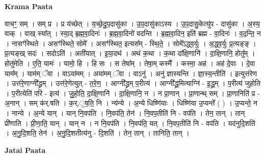 \documentclass[17pt]{extarticle}
\begin{document}
\textbf{Krama Paata} \newline

वाचꣳ॒॒ सम् । सम् प्र । प्र य॑च्छेत् । य॒च्छे॒दु॒प॒दासु॑का । उ॒प॒दासु॑काऽस्य । उ॒प॒दासु॒केत्यु॑प - दासु॑का । अ॒स्य॒ वाक् । वाख् स्या᳚त् । स्या॒द् ब्र॒ह्म॒वा॒दिनः॑ । ब्र॒ह्म॒वा॒दिनो॑ वदन्ति । ब्र॒ह्म॒वा॒दिन॒ इति॑ ब्रह्म - वा॒दिनः॑ । व॒द॒न्ति॒ न । नासꣳ॑स्थिते । असꣳ॑स्थिते॒ सोमे᳚ । असꣳ॑स्थित॒ इत्यस᳚म् - स्थि॒ते॒ । सोमे᳚ऽद्ध्व॒र्युः । अ॒द्ध्व॒र्युः प्र॒त्यङ्‍ङ् । प्र॒त्यङ्‍ख् सदः॑ । सदोऽति॑ । अती॑यात् । इ॒या॒दथ॑ । अथ॑ क॒था । क॒था दा᳚क्षि॒णानि॑ । दा॒क्षि॒णानि॒ होतु᳚म् । होतु॑मेति । ए॒ति॒ यामः॑ । यामो॒ हि । हि सः । स तेषा᳚म् । तेषा॒म् कस्मै᳚ । कस्मा॒ अह॑ । अह॑ दे॒वाः । दे॒वा याम᳚म् । याम॑म् ॅवा । वाऽया॑मम् । अया॑मम् ॅवा । वाऽनु॑ । अनु॑ ज्ञास्यन्ति । ज्ञा॒स्य॒न्तीति॑ । इत्युत्त॑रेण । उत्त॑रे॒णाग्नी᳚द्ध्रम् । उत्त॑रे॒णेत्युत् - त॒रे॒ण॒ । आग्नी᳚द्ध्रम् प॒रीत्य॑ । आग्नी᳚द्ध्र॒मित्याग्नि॑ - इ॒द्ध्र॒म् । प॒रीत्य॑ जुहोति । प॒रीत्येति॑ परि - इत्य॑ । जु॒हो॒ति॒ दा॒क्षि॒णानि॑ । दा॒क्षि॒णानि॒ न । न प्रा॒णान् । प्रा॒णान्थ् सम् । प्रा॒णानिति॑ प्र - अ॒नान् । सम् क॑र्.षति । क॒र्.॒ष॒ति॒ नि । न्य॑न्ये । अ॒न्ये धिष्णि॑याः । धिष्णि॑या उ॒प्यन्ते᳚ ( ) । उ॒प्यन्ते॒ न । नान्ये । अ॒न्ये यान् । यान् नि॒वप॑ति । नि॒वप॑ति॒ तेन॑ । नि॒वप॒तीति॑ नि - वप॑ति । तेन॒ तान् । तान् प्री॑णाति । प्री॒णा॒ति॒ यान् । यान् न । न नि॒वप॑ति । नि॒वप॑ति॒ यत् । नि॒वप॒तीति॑ नि - वप॑ति । यद॑नुदि॒शति॑ । अ॒नु॒दि॒शति॒ तेन॑ । अ॒नु॒दि॒शतीत्य॑नु - दि॒शति॑ । तेन॒ तान् । तानिति॒ तान् । \newline

\textbf{Jatai Paata} \newline
\end{document}
